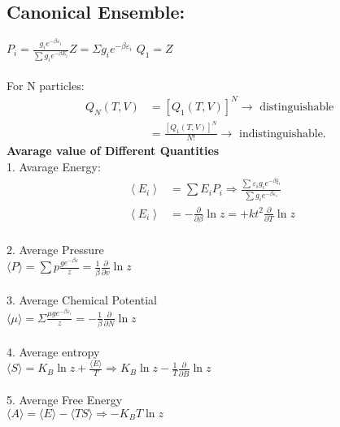 \subsection{Canonical Ensemble:}
$P_{i}=\frac{g_{i} e^{-\beta \varepsilon_{i}}}{\sum g_{i} e^{-\beta E_{i}}}$\hspace{2cm}$Z=\Sigma g_{i} e^{-\beta \varepsilon_{i}}$
\quad$Q_1 = Z$\\\\
 For N particles:
\begin{align*}
 Q_{N}(T, V) &=\left[Q_{1}(T, V)\right]^{N} \rightarrow \text { distinguishable } \\ &=\frac{\left[Q_{1}(T, V)\right]^{N}}{N !} \rightarrow \text { indistinguishable. } 
 \end{align*}
\textbf{Avarage value of Different Quantities}\\
1. Avarage Energy:\\
\begin{align*}
\left\langle E_{i}\right\rangle&=\sum E_{i} P_{i} \Rightarrow \frac{\sum \varepsilon_{i} g_{i} e^{-\beta \xi_{i}}}{\sum g_{i} e^{-\beta \varepsilon_{i}}}\\
\left\langle E_{i}\right\rangle&=-\frac{\partial}{\partial \beta} \ln z=+k t^{2} \frac{\partial}{\partial T} \ln z
\end{align*}\\
2. Average Pressure\\
$\langle P\rangle=\sum p \frac{g e^{-\beta \varepsilon}}{z}=\frac{1}{\beta} \frac{\partial}{\partial v} \ln z$\\\\
3. Average Chemical Potential\\
$\langle\mu\rangle=\Sigma \frac{\mu g e^{-\beta \varepsilon_{i}}}{z}=-\frac{1}{\beta} \frac{\partial}{\partial N} \ln z$\\\\
4. Average entropy\\
$\langle S\rangle=K_{B} \ln z+\frac{\langle E\rangle}{T} \Rightarrow K_{B} \ln z-\frac{1}{T} \frac{\partial}{\partial B} \ln z$\\\\
5. Average Free Energy\\
$\langle A\rangle=\langle E\rangle-\langle TS\rangle \Rightarrow-K_{B} T \ln z$





